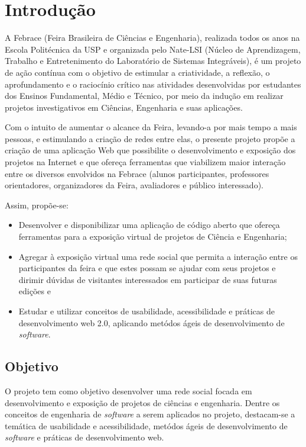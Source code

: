 \documentclass[a4paper,12pt,font=plain,header=plain]{abnt}
\begin{document}
\sumario

\chapter{Introdução}

  A Febrace (Feira Brasileira de Ciências e Engenharia), realizada todos os anos na Escola Politécnica da USP e organizada pelo Nate-LSI (Núcleo de Aprendizagem, Trabalho e Entretenimento do Laboratório de Sistemas Integráveis), é um projeto de ação contínua com o objetivo de estimular a criatividade, a reflexão, o aprofundamento e o raciocínio crítico nas atividades desenvolvidas por estudantes dos Ensinos Fundamental, Médio e Técnico, por meio da indução em realizar projetos investigativos em Ciências, Engenharia e suas aplicações\cite{lopes07}.

  Com o intuito de aumentar o alcance da Feira, levando-a por mais tempo a mais pessoas, e estimulando a criação de redes entre elas, o presente projeto propõe a criação de uma aplicação Web que possibilite o desenvolvimento e exposição dos projetos na Internet e que ofereça ferramentas que viabilizem maior interação entre os diversos envolvidos na Febrace (alunos participantes, professores orientadores, organizadores da Feira, avaliadores e público interessado).

  Assim, propõe-se:

  \begin{itemize}
    \item{
      Desenvolver e disponibilizar uma aplicação de código aberto que ofereça ferramentas para a exposição virtual de projetos de Ciência e Engenharia;
    }
    \item{
		Agregar à exposição virtual uma rede social que permita a interação entre os participantes da feira e que estes possam se ajudar com seus projetos e dirimir dúvidas de visitantes interessados em participar de suas futuras edições e
    }
    \item{
		Estudar e utilizar conceitos de usabilidade, acessibilidade e práticas de desenvolvimento web 2.0, aplicando metódos ágeis de desenvolvimento de \textit{software}.
    }
  \end{itemize}

  \section{Objetivo}
    O projeto tem como objetivo desenvolver uma rede social focada em desenvolvimento e exposição de projetos de ciências e engenharia. Dentre os conceitos de engenharia de \textit{software} a serem aplicados no projeto, destacam-se a temática de usabilidade e acessibilidade, metódos ágeis de desenvolvimento de \textit{software} e práticas de desenvolvimento web.
\end{document}
